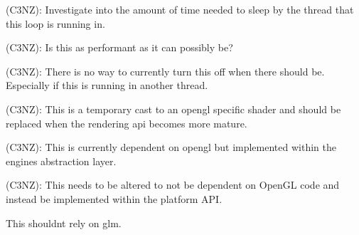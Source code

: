 
\begin{DoxyRefList}
\item[Member \mbox{\hyperlink{classlambda_1_1core_1_1io_1_1EventLoop_a00fd46aae12da78a44086ab1247d5629}{lambda\+::core\+::io\+::Event\+Loop\+::Run}} ()]\label{todo__todo000001}%
%
(C3\+NZ)\+: Investigate into the amount of time needed to sleep by the thread that this loop is running in. 

(C3\+NZ)\+: Is this as performant as it can possibly be? 

(C3\+NZ)\+: There is no way to currently turn this off when there should be. Especially if this is running in another thread.  
\item[Member \mbox{\hyperlink{classlambda_1_1core_1_1renderer_1_1Renderer_aebe538ed30fd76b4b918b8ca03c0765c}{lambda\+::core\+::renderer\+::Renderer\+::Submit}} (core\+::memory\+::\+Shared$<$ Vertex\+Array $>$ vertex\+\_\+array, core\+::memory\+::\+Shared$<$ Shader $>$ shader, const glm\+::mat4 \&transform=glm\+::mat4(1.\+0f))]\label{todo__todo000002}%
%
(C3\+NZ)\+: This is a temporary cast to an opengl specific shader and should be replaced when the rendering api becomes more mature.  
\item[Member \mbox{\hyperlink{classlambda_1_1core_1_1renderer_1_1Renderer2D_add05f542bc7bd929ada2b74118a54762}{lambda\+::core\+::renderer\+::Renderer2D\+::Init}} ()]\label{todo__todo000003}%
%
(C3\+NZ)\+: This is currently dependent on opengl but implemented within the engines abstraction layer.  
\item[Member \mbox{\hyperlink{classlambda_1_1core_1_1renderer_1_1Renderer2D_a3010ab7bc0ee09cccc62a1cfe9c5b86d}{lambda\+::core\+::renderer\+::Renderer2D\+::Begin\+Scene}} (const \mbox{\hyperlink{classlambda_1_1core_1_1renderer_1_1OrthographicCamera}{Orthographic\+Camera}} \&camera)]\label{todo__todo000004}%
%
(C3\+NZ)\+: This needs to be altered to not be dependent on Open\+GL code and instead be implemented within the platform A\+PI.  
\item[Member \mbox{\hyperlink{classlambda_1_1core_1_1renderer_1_1Shader_a3e47a2a0d9fd7210d491663df083c623}{lambda\+::core\+::renderer\+::Shader\+::Set\+Mat4}} (const std\+::string \&name, const glm\+::mat4 \&matrix)=0]\label{todo__todo000005}%
%
This shouldn\textquotesingle{}t rely on glm. 
\end{DoxyRefList}